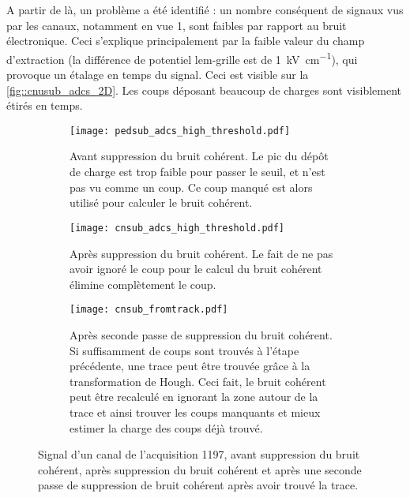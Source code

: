      A partir de là, un problème a été identifié : un nombre conséquent de signaux vus par les canaux, notamment en vue 1, sont faibles par rapport au bruit électronique. Ceci s'explique principalement par la faible valeur du champ d'extraction (la différence de potentiel \gls{lem}-grille est de \SI{1}{\kilo\volt\per\centi\meter}), qui provoque un étalage en temps du signal. Ceci est visible sur la \autoref{fig::cnusub_adcs_2D}. Les coups déposant beaucoup de charges sont visiblement étirés en temps.

      \begin{figure}[htbp]
        \centering
        \begin{subfigure}[t]{0.9\textwidth}
          \centering
          \texttt{[image: pedsub\_adcs\_high\_threshold.pdf]}
          \caption{Avant suppression du bruit cohérent. Le pic du dépôt de charge est trop faible pour passer le seuil, et n'est pas vu comme un coup. Ce coup manqué est alors utilisé pour calculer le bruit cohérent.}
        \end{subfigure}\hfill
        \begin{subfigure}[t]{0.9\textwidth}
          \centering
          \texttt{[image: cnsub\_adcs\_high\_threshold.pdf]}
          \caption{Après suppression du bruit cohérent. Le fait de ne pas avoir ignoré le coup pour le calcul du bruit cohérent élimine complètement le coup.}
        \end{subfigure}
        \begin{subfigure}[t]{0.9\textwidth}
          \centering
          \texttt{[image: cnsub\_fromtrack.pdf]}
          \caption{Après seconde passe de suppression du bruit cohérent. Si suffisamment de coups sont trouvés à l'étape précédente, une trace peut être trouvée grâce à la transformation de Hough. Ceci fait, le bruit cohérent peut être recalculé en ignorant la zone autour de la trace et ainsi trouver les coups manquants et mieux estimer la charge des coups déjà trouvé.}
        \end{subfigure}
        \caption[Supression du bruit cohérent]{\label{fig::strip_before_after_cnsub}Signal d'un canal de l'acquisition 1197, avant suppression du bruit cohérent, après suppression du bruit cohérent et après une seconde passe de suppression de bruit cohérent après avoir trouvé la trace.}
      \end{figure}

